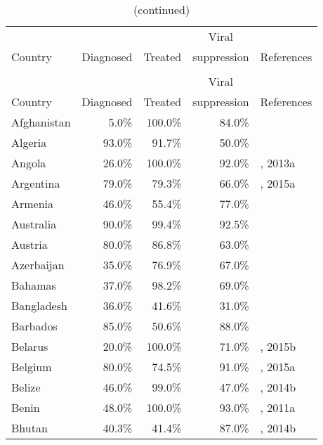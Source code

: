 \begin{longtable}{lrrrl}
  \caption{The treatment cascade.}
  \label{data_source_treatment_cascade}
  \\[-2ex]
  \hline  
  & & & \multicolumn{1}{c}{Viral} \\
  Country & \multicolumn{1}{l}{Diagnosed}
  & \multicolumn{1}{l}{Treated} & \multicolumn{1}{l}{suppression}
  & References \\
  \hline
  \endfirsthead
  \caption{(continued)}
  \\[-2ex]
  \hline  
  & & & \multicolumn{1}{c}{Viral} \\
  Country & \multicolumn{1}{l}{Diagnosed}
  & \multicolumn{1}{l}{Treated} & \multicolumn{1}{l}{suppression}
  & References \\
  \hline
  \endhead
  \hline
  \endfoot
  \endlastfoot
  Afghanistan & 5.0\% & 100.0\% & 84.0\% & \cite{Unaids2016-an} \\
  Algeria & 93.0\% & 91.7\% & 50.0\% & \cite{Unaids2016-an} \\
  Angola & 26.0\% & 100.0\% & 92.0\% & \cite{Unaids2016-an}, 2013a \\
  Argentina & 79.0\% & 79.3\% & 66.0\% & \cite{Unaids2016-an}, 2015a \\
  Armenia & 46.0\% & 55.4\% & 77.0\% & \cite{Unaids2016-an} \\
  Australia & 90.0\% & 99.4\% & 92.5\% & \cite{Unaids2016-an, kirby2014}  \\
  Austria & 80.0\% & 86.8\% & 63.0\% & \cite{ahivcos2015} \\
  Azerbaijan & 35.0\% & 76.9\% & 67.0\% & \cite{Unaids2016-an} \\
  Bahamas & 37.0\% & 98.2\% & 69.0\% & \cite{Unaids2016-an} \\
  Bangladesh & 36.0\% & 41.6\% & 31.0\% & \cite{Unaids2016-an} \\
  Barbados & 85.0\% & 50.6\% & 88.0\% & \cite{Unaids2016-an} \\
  Belarus & 20.0\% & 100.0\% & 71.0\% & \cite{Unaids2016-an}, 2015b \\
  Belgium & 80.0\% & 74.5\% & 91.0\% & \cite{Unaids2016-an,europa2012}, 2015a \\
  Belize & 46.0\% & 99.0\% & 47.0\% & \cite{Unaids2016-an}, 2014b \\
  Benin & 48.0\% & 100.0\% & 93.0\% & \cite{Unaids2016-an}, 2011a \\
  Bhutan & 40.3\% & 41.4\% & 87.0\% & \cite{Unaids2016-an, Unaids2016-am}, 2014b \\

\end{longtable}
